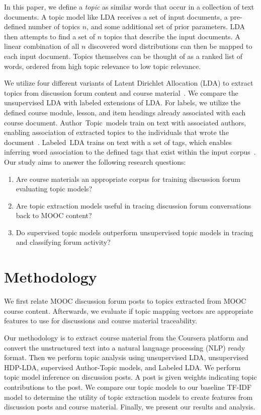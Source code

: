 \documentclass[sigconf, anonymous]{acmart}
\begin{document}
In this paper, we define a \textit{topic} as similar words that occur in a collection of text documents.
A topic model like LDA receives a set of input documents, a pre-defined number of topics $n$, and some additional set of prior parameters.
LDA then attempts to find a set of $n$ topics that describe the input documents.
A linear combination of all $n$ discovered word distributions can then be mapped to each input document.
Topics themselves can be thought of as a ranked list of words, ordered from high topic relevance to low topic relevance.

We utilize four different variants of Latent Dirichlet Allocation (LDA) to extract topics from discussion forum content and course material~\cite{blei2003latent}.
We compare the unsupervised LDA with labeled extensions of LDA.
For labels, we utilize the defined course module, lesson, and item headings already associated with each course document.
Author~Topic~models train on text with associated authors, enabling association of extracted topics to the individuals that wrote the document~\cite{rosen2004author}.
Labeled~LDA trains on text with a set of tags, which enables inferring word association to the defined tags that exist within the input corpus~\cite{ramage2009labeled}.
Our study aims to answer the following research questions:

\begin{enumerate}[label=\textbf{RQ\arabic*:}]
    \item Are course materials an appropriate corpus for training discussion forum evaluating topic models? %
    \item Are topic extraction models useful in tracing discussion forum conversations back to MOOC content? %
    \item Do supervised topic models outperform unsupervised topic models in tracing and classifying forum activity? %
\end{enumerate}


\section{Methodology}
We first relate MOOC discussion forum posts to topics extracted from MOOC course content.
Afterwards, we evaluate if topic mapping vectors are appropriate features to use for discussions and course material traceability.

Our methodology is to extract course material from the Coursera platform and convert the unstructured text into a natural language processing (NLP) ready format.
Then we perform topic analysis using unsupervised LDA, unsupervised HDP-LDA, supervised Author-Topic models, and Labeled LDA.
We perform topic model inference on discussion posts. A post is given weights indicating topic contributions to the post.
We compare our topic models to our baseline TF-IDF model to determine the utility of topic extraction models to create features from discussion posts and course material.
Finally, we present our results and analysis.
\end{document}
